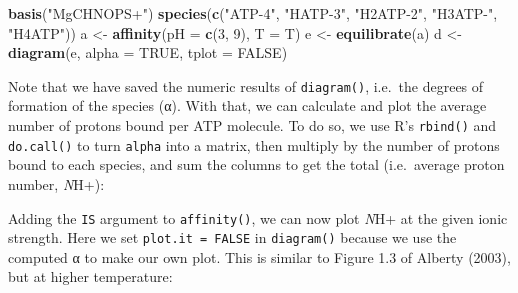 \documentclass[]{tufte-book}
\newenvironment{Shaded}{}{}
\newcommand{\KeywordTok}[1]{\textcolor[rgb]{0.00,0.44,0.13}{\textbf{#1}}}
\newcommand{\DataTypeTok}[1]{\textcolor[rgb]{0.56,0.13,0.00}{#1}}
\newcommand{\DecValTok}[1]{\textcolor[rgb]{0.25,0.63,0.44}{#1}}
\newcommand{\StringTok}[1]{\textcolor[rgb]{0.25,0.44,0.63}{#1}}
\newcommand{\OtherTok}[1]{\textcolor[rgb]{0.00,0.44,0.13}{#1}}
\newcommand{\OperatorTok}[1]{\textcolor[rgb]{0.40,0.40,0.40}{#1}}
\newcommand{\NormalTok}[1]{#1}
\begin{document}
\begin{Shaded}
\begin{Highlighting}[]
\KeywordTok{basis}\NormalTok{(}\StringTok{"MgCHNOPS+"}\NormalTok{)}
\KeywordTok{species}\NormalTok{(}\KeywordTok{c}\NormalTok{(}\StringTok{"ATP-4"}\NormalTok{, }\StringTok{"HATP-3"}\NormalTok{, }\StringTok{"H2ATP-2"}\NormalTok{, }\StringTok{"H3ATP-"}\NormalTok{, }\StringTok{"H4ATP"}\NormalTok{))}
\NormalTok{a <-}\StringTok{ }\KeywordTok{affinity}\NormalTok{(}\DataTypeTok{pH =} \KeywordTok{c}\NormalTok{(}\DecValTok{3}\NormalTok{, }\DecValTok{9}\NormalTok{), }\DataTypeTok{T =}\NormalTok{ T)}
\NormalTok{e <-}\StringTok{ }\KeywordTok{equilibrate}\NormalTok{(a)}
\NormalTok{d <-}\StringTok{ }\KeywordTok{diagram}\NormalTok{(e, }\DataTypeTok{alpha =} \OtherTok{TRUE}\NormalTok{, }\DataTypeTok{tplot =} \OtherTok{FALSE}\NormalTok{)}
\end{Highlighting}
\end{Shaded}

Note that we have saved the numeric results of {\texttt{diagram()}},
i.e.~the degrees of formation of the species (α). With that, we can
calculate and plot the average number of protons bound per ATP molecule.
To do so, we use R's \texttt{rbind()} and \texttt{do.call()} to turn
\texttt{alpha} into a matrix, then multiply by the number of protons
bound to each species, and sum the columns to get the total
(i.e.~average proton number, \emph{N}H+):

\begin{Shaded}
\end{Shaded}

Adding the \texttt{IS} argument to {\texttt{affinity()}}, we can now
plot \emph{N}H+ at the given ionic strength. Here we set
\texttt{plot.it\ =\ FALSE} in \texttt{diagram()} because we use the
computed α to make our own plot. This is similar to Figure 1.3 of
Alberty (2003), but at higher temperature:
\end{document}
